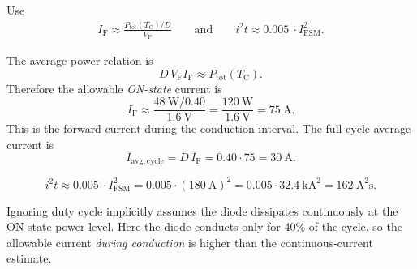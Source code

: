 \vspace{0.2cm}

Use
    \begin{align*}
        I_\mathrm{F} \approx \frac{P_{\mathrm{tot}}(T_\mathrm{C})/D}{V_\mathrm{F}}  \qquad \text{and} \qquad
        i^2t \approx 0.005\ \cdot  I_\mathrm{FSM}^2.
    \end{align*}


\begin{solutionblock}
    The average power relation is
    \begin{equation}
        D\,V_\mathrm{F}I_\mathrm{F} \approx P_{\mathrm{tot}}(T_\mathrm{C}).
    \end{equation}
    Therefore the allowable \emph{ON-state} current is
    \begin{equation}
        I_\mathrm{F} \approx \frac{\SI{48}{\watt}/0.40}{\SI{1.6}{\volt}} = \frac{\SI{120}{\watt}}{\SI{1.6}{\volt}} = \SI{75}{\ampere}.
    \end{equation}
    This is the forward current during the conduction interval. The full-cycle average current is
    \begin{equation}
        I_{\mathrm{avg,cycle}} = D\,I_\mathrm{F} = 0.40 \cdot 75 = \SI{30}{\ampere}.
    \end{equation}
\end{solutionblock}

\begin{solutionblock}
    \begin{equation}
        i^2t \approx 0.005\ \cdot I_\mathrm{FSM}^2 = 0.005 \cdot (\SI{180}{\ampere})^2 = 0.005 \cdot \SI{32.4}{\kilo\ampere\squared} = \SI{162}{\ampere\squared\second}.
    \end{equation}
\end{solutionblock}

\begin{solutionblock}
Ignoring duty cycle implicitly assumes the diode dissipates continuously at the ON-state power level. Here the diode conducts only for 40\% of the cycle, so the allowable current \emph{during conduction} is higher than the continuous-current estimate.
\end{solutionblock}


